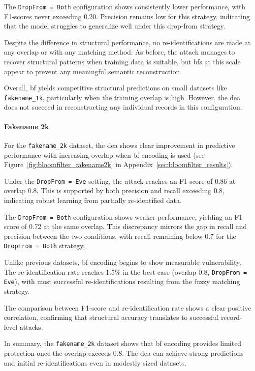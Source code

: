 The \texttt{DropFrom = Both} configuration shows consistently lower performance, with F1-scores never exceeding 0.20.
Precision remains low for this strategy, indicating that the model struggles to generalize well under this drop-from strategy.

Despite the difference in structural performance, no re-identifications are made at any overlap or with any matching method.
As before, the attack manages to recover structural patterns when training data is suitable, but \ac{bf}s at this scale appear to prevent any meaningful semantic reconstruction.

Overall, \ac{bf} yields competitive structural predictions on small datasets like \texttt{fakename\_1k}, particularly when the training overlap is high.
However, the \ac{dea} does not succeed in reconstructing any individual records in this configuration.

\paragraph{Fakename 2k}

For the \texttt{fakename\_2k} dataset, the \ac{dea} shows clear improvement in predictive performance with increasing overlap when \ac{bf} encoding is used (see Figure~\ref{fig:bloomfilter_fakename2k} in Appendix~\ref{sec:bloomfilter_results}).

Under the \texttt{DropFrom = Eve} setting, the attack reaches an F1-score of 0.86 at overlap 0.8.
This is supported by both precision and recall exceeding 0.8, indicating robust learning from partially re-identified data.

The \texttt{DropFrom = Both} configuration shows weaker performance, yielding an F1-score of 0.72 at the same overlap.
This discrepancy mirrors the gap in recall and precision between the two conditions, with recall remaining below 0.7 for the \texttt{DropFrom = Both} strategy.

Unlike previous datasets, \ac{bf} encoding begins to show measurable vulnerability.
The re-identification rate reaches 1.5\% in the best case (overlap 0.8, \texttt{DropFrom = Eve}), with most successful re-identifications resulting from the fuzzy matching strategy.

The comparison between F1-score and re-identification rate shows a clear positive correlation, confirming that structural accuracy translates to successful record-level attacks.

In summary, the \texttt{fakename\_2k} dataset shows that \ac{bf} encoding provides limited protection once the overlap exceeds 0.8.
The \ac{dea} can achieve strong predictions and initial re-identifications even in modestly sized datasets.

